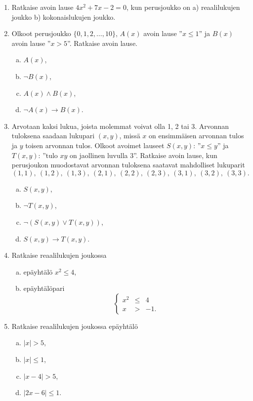 \begin{enumerate}
\item
Ratkaise avoin lause $4x^2 + 7x - 2 = 0$, kun perusjoukko
on a) reaalilukujen joukko b) kokonaislukujen joukko.

\item
Olkoot perusjoukko $\{ 0, 1, 2, \ldots , 10\}$, $A(x)$
avoin lause ''$x \le 1$'' ja $B(x)$ avoin lause ''$x > 5$''.
Ratkaise avoin lause.
\begin{enumerate}[a)]
\item $A(x)$,
\item $\lnot B(x)$,
\item $A(x) \land B(x)$,
\item $\lnot A(x) \to B(x)$.
\end{enumerate}

\item
Arvotaan kaksi lukua, joista molemmat voivat olla 1, 2 tai 3. Arvonnan tuloksena saadaan lukupari $(x, y)$, missä $x$ on ensimmäisen arvonnan tulos ja $y$ toisen arvonnan tulos. Olkoot avoimet lauseet $S(x, y)$: ''$x \le y$'' ja $T(x, y)$: ''tulo $xy$ on jaollinen luvulla 3''. Ratkaise avoin lause, kun perusjoukon muodostavat arvonnan tuloksena saatavat mahdolliset lukuparit
\[
(1, 1),\ (1, 2),\ (1, 3),\ (2, 1),\ (2, 2),\ (2, 3),\ (3, 1),\ (3, 2),\ (3, 3).
\]
\begin{enumerate}[a)]
\item $S(x, y)$,
\item $\lnot T(x, y)$,
\item $\lnot (S(x, y) \lor T(x, y))$,
\item $S(x, y) \to T(x, y)$.
\end{enumerate}

\item
Ratkaise reaalilukujen joukossa
\begin{enumerate}[a)]
\item epäyhtälö $x^2 \le 4$,
\item epäyhtälöpari
\[
\left\{
\begin{array}{rcl}
x^2 & \le & 4 \\
x & > & -1.
\end{array}\right.
\]
\end{enumerate}

\item
Ratkaise reaalilukujen joukossa epäyhtälö
\begin{enumerate}[a)]
\item $|x| > 5$,
\item $|x| \le 1$,
\item $|x - 4| > 5$,
\item $|2x - 6| \le 1$.
\end{enumerate}


\end{enumerate}
